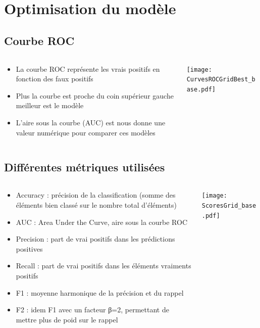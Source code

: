 \documentclass[8pt,aspectratio=169,hyperref={unicode=true}]{beamer}
\begin{document}
\section{Optimisation du modèle}
\subsection{Courbe ROC}
\begin{frame}{\insertsection}{\insertsubsection}
    \begin{columns}
        \begin{column}{.5\textwidth}
            \begin{itemize}
                \item La courbe ROC représente les vrais positifs en fonction des faux positifs
                \item Plus la courbe est proche du coin supérieur gauche meilleur est le modèle
                \item L'aire sous la courbe (AUC) est nous donne une valeur numérique pour comparer ces modèles
            \end{itemize}
        \end{column}
        \begin{column}{.5\textwidth}
            \texttt{[image: CurvesROCGridBest\_base.pdf]}
        \end{column}
    \end{columns}
\end{frame}

\subsection{Différentes métriques utilisées}
\begin{frame}{\insertsection}{\insertsubsection}
    \begin{columns}
        \begin{column}{.5\textwidth}
            \begin{itemize}
                \item Accuracy : précision de la classification (somme des éléments bien classé sur le nombre total d'éléments)
                \item AUC : Area Under the Curve, aire sous la courbe ROC
                \item Precision : part de vrai positifs dans les prédictions positives
                \item Recall : part de vrai positifs dans les éléments vraiments positifs
                \item F1 : moyenne harmonique de la précision et du rappel
                \item F2 : idem F1 avec un facteur β=2, permettant de mettre plus de poid sur le rappel
            \end{itemize}
        \end{column}
        \begin{column}{.5\textwidth}
            \texttt{[image: ScoresGrid\_base.pdf]}
        \end{column}
    \end{columns}
\end{frame}
\end{document}
